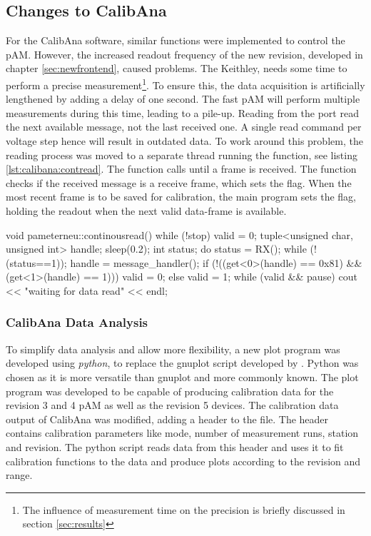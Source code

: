 \subsection{Changes to CalibAna}
\label{sec:solving:calibana}
For the CalibAna software, similar functions were implemented to control the \ac{pAM}. However, the increased readout frequency of the new revision, developed in chapter \ref{sec:newfrontend}, caused problems.
The Keithley, needs some time to perform a precise measurement\footnote{The influence of measurement time on the precision is briefly discussed in section \ref{sec:results}}. To ensure this, the data acquisition is artificially lengthened by adding a delay of one second. The fast \ac{pAM} will perform multiple measurements during this time, leading to a pile-up.
Reading from the port read the next available message, not the last received one. A single read command per voltage step hence will result in outdated data. To work around this problem, the reading process was moved to a separate thread running the  function, see listing \ref{lst:calibana:contread}. The function calls  until a frame is received. The  function checks if the received message is a receive frame, which sets the  flag. When the most recent frame is to be saved for calibration, the main program sets the  flag, holding the readout when the next valid data-frame is available.
\begin{codecpp}[caption={\ac{cpp} function, that continuously tries to read from the USB port and on success stores the message\label{lst:calibana:contread}.}]
void pameterneu::continousread()
{
	while (!stop) {
		valid = 0;
		tuple<unsigned char, unsigned int> handle;
		sleep(0.2);
		int status;
		do {
			status = RX();
		} while (!(status==1));
		handle = message_handler();
		if (!((get<0>(handle) == 0x81) && (get<1>(handle) == 1))) {
			valid = 0;
		} else {
			valid = 1;
		}
		while (valid && pause) {
			cout << "waiting for data read" << endl;
		}
	}
}
\end{codecpp}
\subsubsection*{CalibAna Data Analysis}
To simplify data analysis and allow more flexibility, a new plot program was developed using \textit{python}, to replace the gnuplot script developed by \cite{roedel}. Python was chosen as it is more versatile than gnuplot and more commonly known. %
The plot program was developed to be capable of producing calibration data for the revision 3 and 4 \ac{pAM} as well as the revision 5 devices.
The calibration data output of CalibAna was modified, adding a header to the file. The header contains calibration parameters like mode, number of measurement runs, station and revision. The python script reads data from this header and uses it to fit calibration functions to the data and produce plots according to the revision and range.


